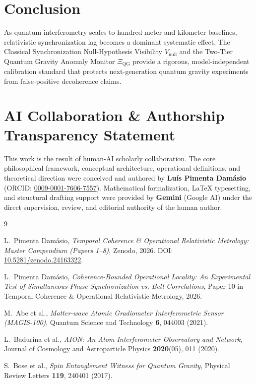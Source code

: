 \documentclass[11pt,a4paper]{article}
\begin{document}
\section{Conclusion}

As quantum interferometry scales to hundred-meter and kilometer baselines, relativistic synchronization lag becomes a dominant systematic effect. The Classical Synchronization Null-Hypothesis Visibility $V_{\mathrm{null}}$ and the Two-Tier Quantum Gravity Anomaly Monitor $\Xi_{\mathrm{QG}}$ provide a rigorous, model-independent calibration standard that protects next-generation quantum gravity experiments from false-positive decoherence claims.

\section*{AI Collaboration \& Authorship Transparency Statement}

This work is the result of human-AI scholarly collaboration. The core philosophical framework, conceptual architecture, operational definitions, and theoretical direction were conceived and authored by \textbf{Lu\'{i}s Pimenta Dam\'{a}sio} (ORCID: \href{https://orcid.org/0009-0001-7606-7557}{0009-0001-7606-7557}). Mathematical formalization, LaTeX typesetting, and structural drafting support were provided by \textbf{Gemini} (Google AI) under the direct supervision, review, and editorial authority of the human author.

\begin{thebibliography}{9}

L.~{Pimenta Dam\'{a}sio}, \emph{Temporal Coherence \& Operational Relativistic Metrology: Master Compendium (Papers 1--8)}, Zenodo, 2026. DOI: \href{https://doi.org/10.5281/zenodo.24163322}{10.5281/zenodo.24163322}.

L.~{Pimenta Dam\'{a}sio}, \emph{Coherence-Bounded Operational Locality: An Experimental Test of Simultaneous Phase Synchronization vs. Bell Correlations}, Paper 10 in Temporal Coherence \& Operational Relativistic Metrology, 2026.

M.~Abe et al., \emph{Matter-wave Atomic Gradiometer Interferometric Sensor (MAGIS-100)}, Quantum Science and Technology \textbf{6}, 044003 (2021).

L.~Badurina et al., \emph{AION: An Atom Interferometer Observatory and Network}, Journal of Cosmology and Astroparticle Physics \textbf{2020}(05), 011 (2020).

S.~Bose et al., \emph{Spin Entanglement Witness for Quantum Gravity}, Physical Review Letters \textbf{119}, 240401 (2017).

\end{thebibliography}
\end{document}
